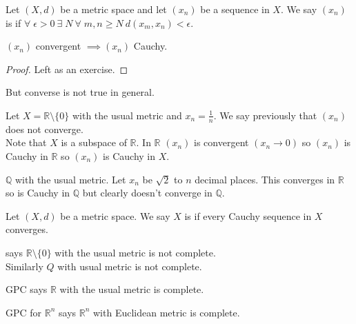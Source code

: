 \begin{definition}
    Let $(X, d)$ be a metric space and let $(x_n)$ be a sequence in $X$.
    We say $(x_n)$ is  if $\forall \; \epsilon > 0 \ \exists \; N \ \forall \; m, n \geq N \ d(x_m, x_n) < \epsilon$.
\end{definition} 

\begin{theorem}
    $(x_n)$ convergent $\implies (x_n)$ Cauchy.
\end{theorem} 
\begin{proof}
    Left as an exercise.
\end{proof} 

But converse is not true in general.

\begin{example} \label{exm:rnot0}
    Let $X = \mathbb{R} \setminus \{0\}$ with the usual metric and $x_n = \frac{1}{n}$.
    We say previously that $(x_n)$ does not converge. \\
    Note that $X$ is a subspace of $\mathbb{R}$.
    In $\mathbb{R}$ $(x_n)$ is convergent $(x_n \to 0)$ so $(x_n)$ is Cauchy in $\mathbb{R}$ so $(x_n)$ is Cauchy in $X$.
\end{example} 

\begin{example}
    $\mathbb{Q}$ with the usual metric.
    Let $x_n$ be $\sqrt{2}$ to $n$ decimal places.
    This converges in $\mathbb{R}$ so is Cauchy in $\mathbb{Q}$ but clearly doesn't converge in $\mathbb{Q}$.
\end{example} 

\begin{definition}[Completeness]
    Let $(X, d)$ be a metric space.
    We say $X$ is  if every Cauchy sequence in $X$ converges.
\end{definition} 

\begin{example}
     says $\mathbb{R} \setminus \{0\}$ with the usual metric is not complete. \\
    Similarly $Q$ with usual metric is not complete.
\end{example} 

\begin{example}
    GPC says $\mathbb{R}$ with the usual metric is complete.
\end{example} 

\begin{example}
    GPC for $\mathbb{R}^n$ says $\mathbb{R}^n$ with Euclidean metric is complete.
\end{example} 

